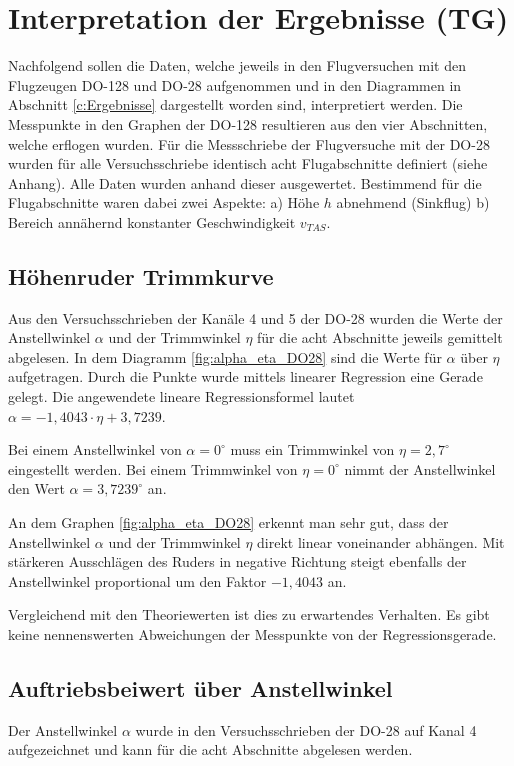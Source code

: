 \chapter{Interpretation der Ergebnisse (TG)}

Nachfolgend sollen die Daten, welche jeweils in den Flugversuchen mit den Flugzeugen DO-128 und DO-28 aufgenommen und in den Diagrammen in Abschnitt \ref{c:Ergebnisse} dargestellt worden sind, interpretiert werden. Die Messpunkte in den Graphen der DO-128 resultieren aus den vier Abschnitten, welche erflogen wurden. Für die Messschriebe der Flugversuche mit der DO-28 wurden für alle Versuchsschriebe identisch acht Flugabschnitte definiert (siehe Anhang). Alle Daten wurden anhand dieser ausgewertet. Bestimmend für die Flugabschnitte waren dabei zwei Aspekte: a) Höhe $h$ abnehmend (Sinkflug)  b) Bereich annähernd konstanter Geschwindigkeit $v_{TAS}$. 


\section{Höhenruder Trimmkurve}
Aus den Versuchsschrieben der Kanäle 4 und 5 der DO-28 wurden die Werte der Anstellwinkel $\alpha$ und der Trimmwinkel $\eta$ für die acht Abschnitte jeweils gemittelt abgelesen. In dem Diagramm \ref{fig:alpha_eta_DO28} sind die Werte für $\alpha$ über $\eta$ aufgetragen. Durch die Punkte wurde mittels linearer Regression eine Gerade gelegt. Die angewendete lineare Regressionsformel lautet $\alpha = -1,4043 \cdot \eta + 3,7239$. 

Bei einem Anstellwinkel von $\alpha = 0^{\circ}$ muss ein Trimmwinkel von $\eta = 2,7^{\circ}$ eingestellt werden. Bei einem Trimmwinkel von $\eta = 0^{\circ}$ nimmt der Anstellwinkel den Wert $\alpha = 3,7239^{\circ}$ an. 

An dem Graphen \ref{fig:alpha_eta_DO28} erkennt man sehr gut, dass der Anstellwinkel $\alpha$ und der Trimmwinkel $\eta$ direkt linear voneinander abhängen. Mit stärkeren Ausschlägen des Ruders in negative Richtung steigt ebenfalls der Anstellwinkel proportional um den Faktor $- 1,4043$ an.

Vergleichend mit den Theoriewerten ist dies zu erwartendes Verhalten. Es gibt keine nennenswerten Abweichungen der Messpunkte von der Regressionsgerade. 


\section{Auftriebsbeiwert über Anstellwinkel}
Der Anstellwinkel $\alpha$ wurde in den Versuchsschrieben der DO-28 auf Kanal 4 aufgezeichnet und kann für die acht Abschnitte abgelesen werden.


